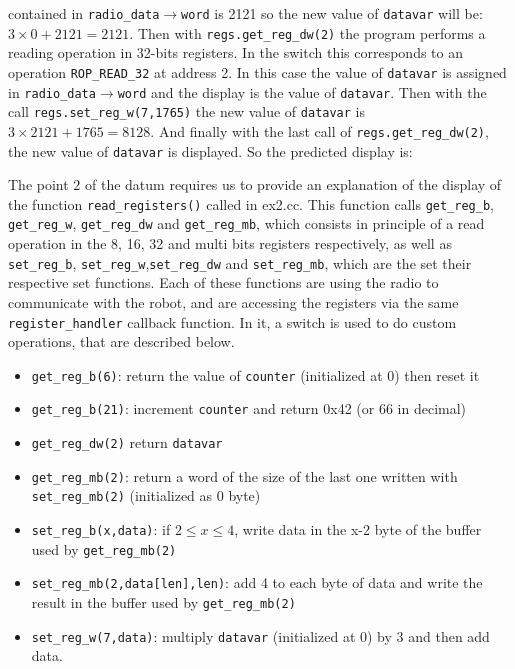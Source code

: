 \documentclass[11pt]{article}
\begin{document}
contained in \texttt{radio\_data}${\rightarrow}$\texttt{word} is 2121 so the new value of \texttt{datavar} will be: ${3\times0 + 2121 = 2121}$. Then with \texttt{regs.get\_reg\_dw(2)} the program performs a reading operation in 32-bits registers. In the switch this corresponds to an operation \texttt{ROP\_READ\_32} at address 2. In this case the value of \texttt{datavar} is assigned in \texttt{radio\_data}${\rightarrow}$\texttt{word} and the display is the value of \texttt{datavar}. Then with the call \texttt{regs.set\_reg\_w(7,1765)} the new value of \texttt{datavar} is ${3\times2121 + 1765 = 8128}$. And finally with the last call of \texttt{regs.get\_reg\_dw(2)}, the new value of \texttt{datavar} is displayed. So the predicted display is:

The point $2$ of the datum requires us to provide an explanation of the display of the function \texttt{read\_registers()} called in ex2.cc. This function calls \texttt{get\_reg\_b}, \texttt{get\_reg\_w}, \texttt{get\_reg\_dw} and \texttt{get\_reg\_mb}, which consists in principle of a read operation in the 8, 16, 32 and multi bits registers respectively, as well as \texttt{set\_reg\_b}, \texttt{set\_reg\_w},\texttt{set\_reg\_dw} and  \texttt{set\_reg\_mb}, which are the set their respective set functions. Each of these functions are using the radio to communicate with the robot, and are accessing the registers via the same \texttt{register\_handler} callback function. In it, a switch is used to do custom operations, that are described below. 

\begin{itemize}
    \item \texttt{get\_reg\_b(6)}: return the value of \texttt{counter} (initialized at 0) then reset it
    \item \texttt{get\_reg\_b(21)}: increment \texttt{counter} and return 0x42 (or 66 in decimal)
    \item \texttt{get\_reg\_dw(2)} return \texttt{datavar}
    \item \texttt{get\_reg\_mb(2)}: return a word of the size of the last one written with \texttt{set\_reg\_mb(2)} (initialized as 0 byte)
    \item \texttt{set\_reg\_b(x,data)}: if $2\leq x \leq 4$, write data in the x-2 byte of the buffer used by \texttt{get\_reg\_mb(2)}
    \item \texttt{set\_reg\_mb(2,data[len],len)}: add 4 to each byte of data and write the result in the buffer used by \texttt{get\_reg\_mb(2)}
    
    \item \texttt{set\_reg\_w(7,data)}: multiply \texttt{datavar} (initialized at 0) by 3 and then add data.
\end{itemize}
\end{document}
